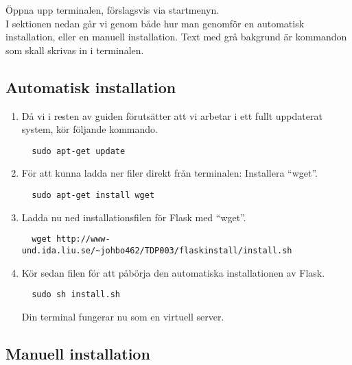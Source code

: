 \documentclass{TDP003mall}
\begin{document}
Öppna upp terminalen, förslagsvis via startmenyn.\\
I sektionen nedan går vi genom både hur man genomför en automatisk installation, eller en manuell installation. Text med grå bakgrund är kommandon som skall skrivas in i terminalen. 
\subsection{Automatisk installation}

\begin{enumerate}
  \item Då vi i resten av guiden förutsätter att vi arbetar i ett fullt uppdaterat system, kör följande kommando.
      \begin{lstlisting}
  sudo apt-get update  
      \end{lstlisting}
 \item För att kunna ladda ner filer direkt från terminalen: Installera ``wget''. 
    \begin{lstlisting}
  sudo apt-get install wget
    \end{lstlisting}
  \item Ladda nu ned installationsfilen för Flask med ``wget''.
      \begin{lstlisting}
  wget http://www-und.ida.liu.se/~johbo462/TDP003/flaskinstall/install.sh
      \end{lstlisting}
  \item Kör sedan filen för att påbörja den automatiska installationen av Flask.
      \begin{lstlisting}
  sudo sh install.sh
      \end{lstlisting}
Din terminal fungerar nu som en virtuell server.\pagebreak

\end{enumerate}

\subsection{Manuell installation}
\end{document}
